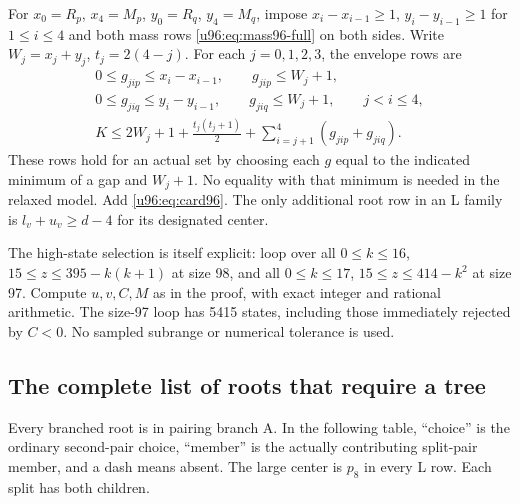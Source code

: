 \documentclass[11pt,a4paper]{article}
\theoremstyle{remark}
\begin{document}
For $x_0=R_p$, $x_4=M_p$, $y_0=R_q$, $y_4=M_q$, impose
$x_i-x_{i-1}\geq1$, $y_i-y_{i-1}\geq1$ for $1\leq i\leq4$ and both
mass rows \eqref{u96:eq:mass96-full} on both sides. Write $W_j=x_j+y_j$,
$t_j=2(4-j)$. For each $j=0,1,2,3$, the envelope rows are
\begin{gather*}
 0\leq g_{jip}\leq x_i-x_{i-1},\qquad g_{jip}\leq W_j+1,\\
 0\leq g_{jiq}\leq y_i-y_{i-1},\qquad g_{jiq}\leq W_j+1,
 \qquad j<i\leq4,\\
 K\leq2W_j+1+\frac{t_j(t_j+1)}2+
                \sum_{i=j+1}^4(g_{jip}+g_{jiq}).
\end{gather*}
These rows hold for an actual set by choosing each $g$ equal to the
indicated minimum of a gap and $W_j+1$. No equality with that minimum is
needed in the relaxed model. Add \eqref{u96:eq:card96}.
The only additional root row in an L family is
$l_v+u_v\geq d-4$ for its designated center.

The high-state selection is itself explicit: loop over all
$0\leq k\leq16$, $15\leq z\leq395-k(k+1)$ at size 98, and all
$0\leq k\leq17$, $15\leq z\leq414-k^2$ at size 97. Compute $u,v,C,M$
as in the proof, with exact integer and rational arithmetic. The size-97
loop has 5415 states, including those immediately rejected by $C<0$.
No sampled subrange or numerical tolerance is used.

\subsection{The complete list of roots that require a tree}
Every branched root is in pairing branch A. In the following table,
``choice'' is the ordinary second-pair choice, ``member'' is the
actually contributing split-pair member, and a dash means absent.
The large center is $p_8$ in every L row. Each split has both children.
\end{document}
